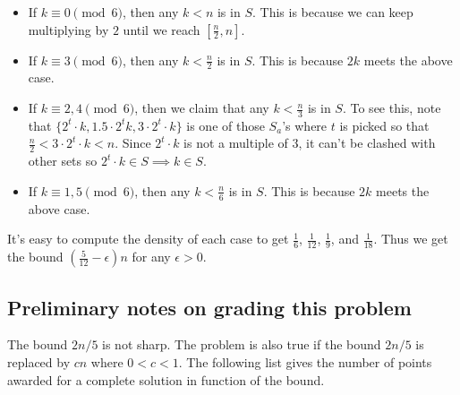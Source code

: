 \begin{itemize}
    \item If $k\equiv 0\pmod 6$, then any $k<n$ is in $S$. This is because we can keep multiplying by $2$ until we reach $\left[\tfrac n2, n\right]$.
    \item If $k\equiv 3\pmod 6$, then any $k<\tfrac n2$ is in $S$. This is because $2k$ meets the above case.
    \item If $k\equiv 2,4\pmod 6$, then we claim that any $k<\tfrac n3$ is in $S$. To see this, note that $\{2^t\cdot k,1.5\cdot 2^tk,3\cdot 2^t\cdot k\}$ is one of those $S_a$'s where $t$ is picked so that $\tfrac n2<3\cdot 2^t\cdot k <n$. Since $2^t\cdot k$ is not a multiple of $3$, it can't be clashed with other sets so $2^t\cdot k\in S\implies k\in S$.
    \item If $k\equiv 1,5\pmod 6$, then any $k<\tfrac n6$ is in $S$. This is because $2k$ meets the above case.
\end{itemize}
It's easy to compute the density of each case to get $\tfrac{1}{6}$, $\tfrac{1}{12}$, $\tfrac{1}{9}$, and $\tfrac{1}{18}$. Thus we get the bound $\left(\tfrac{5}{12}-\epsilon\right)n$ for any $\epsilon >0$.

\subsection{Preliminary notes on grading this problem}
The bound $2n/5$ is not sharp. The problem is also true if the bound $2n/5$ is replaced by $cn$ where $0<c<1$. The following list gives the number of points awarded for a complete solution in function of the bound.
\begin{enumerate}
\end{enumerate}

